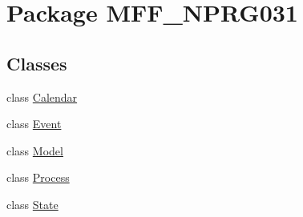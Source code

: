 \hypertarget{namespaceMFF__NPRG031}{\section{Package M\-F\-F\-\_\-\-N\-P\-R\-G031}
\label{namespaceMFF__NPRG031}
}
\subsection*{Classes}
\begin{DoxyCompactItemize}
\item 
class \hyperlink{classMFF__NPRG031_1_1Calendar}{Calendar}
\item 
class \hyperlink{classMFF__NPRG031_1_1Event}{Event}
\item 
class \hyperlink{classMFF__NPRG031_1_1Model}{Model}
\item 
class \hyperlink{classMFF__NPRG031_1_1Process}{Process}
\item 
class \hyperlink{classMFF__NPRG031_1_1State}{State}
\end{DoxyCompactItemize}
